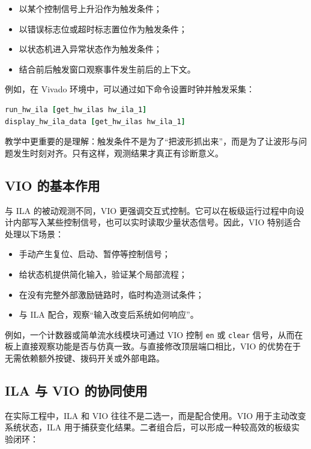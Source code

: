 \begin{itemize}
\tightlist
\item
  以某个控制信号上升沿作为触发条件；
\item
  以错误标志位或超时标志置位作为触发条件；
\item
  以状态机进入异常状态作为触发条件；
\item
  结合前后触发窗口观察事件发生前后的上下文。
\end{itemize}

例如，在 Vivado 环境中，可以通过如下命令设置时钟并触发采集：

\begin{lstlisting}[language=tcl]
run_hw_ila [get_hw_ilas hw_ila_1]
display_hw_ila_data [get_hw_ilas hw_ila_1]
\end{lstlisting}

教学中更重要的是理解：触发条件不是为了``把波形抓出来''，而是为了让波形与问题发生时刻对齐。只有这样，观测结果才真正有诊断意义。

\subsection{VIO 的基本作用}\label{vio-ux7684ux57faux672cux4f5cux7528}

与 ILA 的被动观测不同，VIO
更强调交互式控制。它可以在板级运行过程中向设计内部写入某些控制信号，也可以实时读取少量状态信号。因此，VIO
特别适合处理以下场景：

\begin{itemize}
\tightlist
\item
  手动产生复位、启动、暂停等控制信号；
\item
  给状态机提供简化输入，验证某个局部流程；
\item
  在没有完整外部激励链路时，临时构造测试条件；
\item
  与 ILA 配合，观察``输入改变后系统如何响应''。
\end{itemize}

例如，一个计数器或简单流水线模块可通过 VIO 控制
\passthrough{\lstinline!en!} 或 \passthrough{\lstinline!clear!}
信号，从而在板上直接观察功能是否与仿真一致。与直接修改顶层端口相比，VIO
的优势在于无需依赖额外按键、拨码开关或外部电路。

\subsection{ILA 与 VIO
的协同使用}\label{ila-ux4e0e-vio-ux7684ux534fux540cux4f7fux7528}

在实际工程中，ILA 和 VIO 往往不是二选一，而是配合使用。VIO
用于主动改变系统状态，ILA
用于捕获变化结果。二者组合后，可以形成一种较高效的板级实验闭环：

